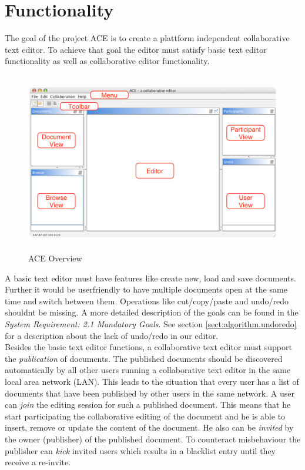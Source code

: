 \chapter{Functionality}
\label{chapter:functionality}

The goal of the project ACE is to create a plattform independent collaborative text editor. To achieve that goal the editor must satisfy basic text editor functionality as well as collaborative editor functionality.\\

\begin{figure}[H]
\begin{center}
  \includegraphics[height=3.1in, width=5.1in]{../images/finalreport/application_ace_overview.eps}
\caption{ACE Overview}
\end{center}
\end{figure}

A basic text editor must have features like create new, load and save documents. Further it would be userfriendly to have multiple documents open at the same time and switch between them. Operations like cut/copy/paste and undo/redo shouldnt be missing. A more detailed description of the goals can be found in the \textit{System Requirement: 2.1 Mandatory Goals}. See section \ref{sect:algorithm.undoredo} for a description about the lack of undo/redo in our editor.\\

Besides the basic text editor functions, a collaborative text editor must support the \textit{publication} of documents. The published documents should be discovered automatically by all other users running a collaborative text editor in the same local area network (LAN). This leads to the situation that every user has a list of documents that have been published by other users in the same network. A user can \textit{join} the editing session for such a published document. This means that he start participating the collaborative editing of the document and he is able to insert, remove or update the content of the document. He also can be \textit{invited} by the owner (publisher) of the published document. To counteract misbehaviour the publisher can \textit{kick} invited users which results in a blacklist entry until they receive a re-invite.

